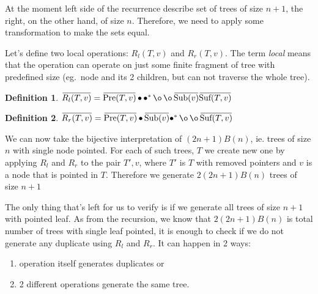 \documentclass[final]{article}
\theoremstyle{definition}
\newtheorem{definition}{Definition}[subsection]
\theoremstyle{remark}
\newcommand{\ols}[1]{\mskip.5\thinmuskip\overline{\mskip-.5\thinmuskip {#1} \mskip-.5\thinmuskip}\mskip.5\thinmuskip} %
\newcommand{\enc}[1]{\ensuremath{\ols{#1}}}
\newcommand{\pointed}[1]{\ensuremath{{#1}^*}}
\DeclareMathOperator{\tSub}{\text{Sub}}
\DeclareMathOperator{\tPre}{\text{Pre}}
\DeclareMathOperator{\tSuf}{\text{Suf}}
\DeclareMathOperator{\n}{\bullet}
\DeclareMathOperator{\no}{\o}
\begin{document}
At the moment left side of the recurrence describe set of trees of size \(n + 1\), the right, on the other hand, of size \(n\). Therefore, we need to apply some transformation to make the sets equal.

Let's define two local operations: \(R_l(T, v)\) and \(R_r(T, v)\). The term \textit{local} means that the operation can operate on just some finite fragment of tree with predefined size (eg.\ node and its 2 children, but can not traverse the whole tree).

\begin{definition}
    \(\enc{R_l(T, v)} = \enc{\tPre(T, v)} \n \pointed{\n} \no \no \enc{\tSub(v)} \enc{\tSuf(T, v)}\)
\end{definition}

\begin{definition}
    \(\enc{R_r(T, v)} = \enc{\tPre(T, v)} \n \enc{\tSub(v)} \pointed{\n} \no \no \enc{\tSuf(T, v)} \)
\end{definition}


We can now take the bijective interpretation of \((2n + 1) B(n)\), ie. trees of size \(n\) with single node pointed. For each of such trees, \(T\) we create new one by applying \(R_l\) and \(R_r\) to the pair \(T', v\), where \(T'\) is \(T\) with removed pointers and \(v\) is a node that is pointed in \(T\). Therefore we generate \(2(2n + 1) B(n)\) trees of size \(n + 1\)

The only thing that's left for us to verify is if we generate all trees of size \(n + 1\) with pointed leaf. As from the recursion, we know that \(2 (2n + 1) B(n)\) is total number of trees with single leaf pointed, it is enough to check if we do not generate any duplicate using \(R_l\) and \(R_r\). It can happen in 2 ways:
\begin{enumerate}
    \item operation itself generates duplicates or
    \item 2 different operations generate the same tree.
\end{enumerate}
\end{document}
